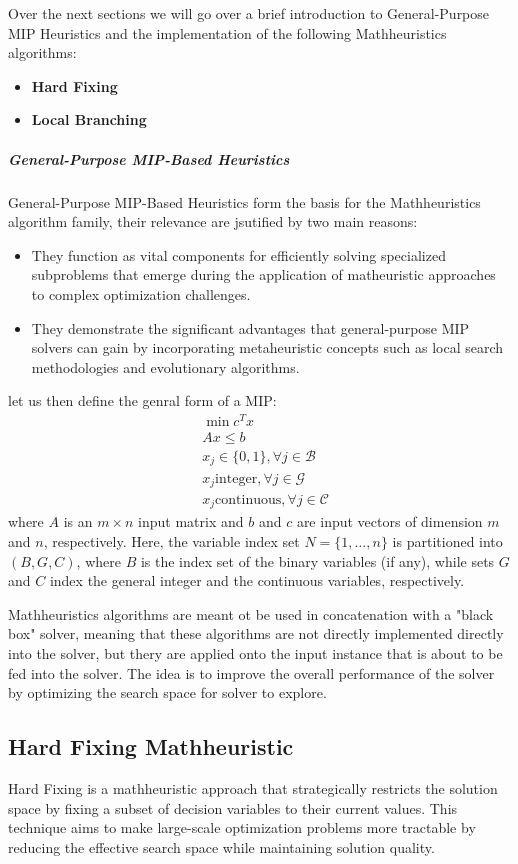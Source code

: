 \documentclass{article}
\begin{document}
Over the next sections we will go over a brief introduction to General-Purpose MIP Heuristics and the implementation of the following Mathheuristics algorithms:
\begin{itemize}
	\item \textbf{Hard Fixing}
	\item \textbf{Local Branching}
\end{itemize}

\subparagraph{General-Purpose MIP-Based Heuristics}
General-Purpose MIP-Based Heuristics form the basis for the Mathheuristics algorithm family, their relevance are jsutified by two main reasons:
\begin{itemize}
	\item They function as vital components for efficiently solving specialized subproblems that emerge during the application of matheuristic approaches to complex optimization challenges.
	\item They demonstrate the significant advantages that general-purpose MIP solvers can gain by incorporating metaheuristic concepts such as local search methodologies and evolutionary algorithms.
\end{itemize}
let us then define the genral form of a MIP:
\begin{align}
	 & \min c^Tx \\
	 & Ax \leq b \\
	 & x_j \in \{0, 1 \}, \forall j \in \mathcal{B} \\
	 & x_j \text{integer}, \forall j \in \mathcal{G} \\
	 & x_j \text{continuous}, \forall j \in \mathcal{C}
\end{align}
where $A$ is an $m \times n$ input matrix and $b$ and $c$ are input vectors of dimension $m$ and $n$, 
respectively. Here, the variable index set $N = \{1, \ldots, n\}$ is partitioned into $(B, G, C)$,
where $B$ is the index set of the binary variables (if any), while sets $G$ and $C$ index the general integer and the continuous variables, 
respectively.

Mathheuristics algorithms are meant ot be used in concatenation with a "black box" solver, meaning that these algorithms are not directly implemented directly into the solver, but thery are 
applied onto the input instance that is about to be fed into the solver. The idea is to improve the overall performance of the solver by optimizing the search space for solver to explore.\cite{Fischetti2016Matheuristics}
\newpage
\subsection{Hard Fixing Mathheuristic}
Hard Fixing is a mathheuristic approach that strategically restricts the solution space by fixing a
subset of decision variables to their current values. This technique aims to make large-scale 
optimization problems more tractable by reducing the effective search space while maintaining solution quality.
\end{document}
